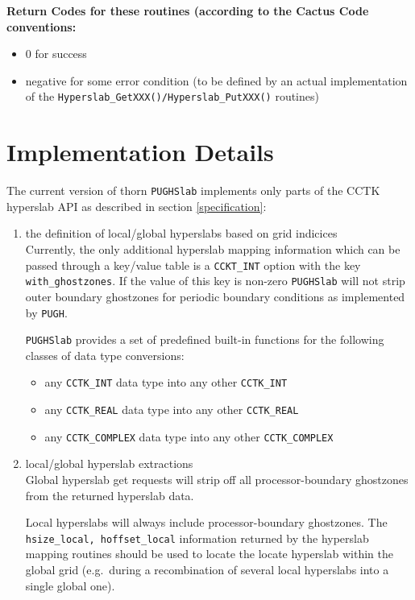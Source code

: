 \documentclass{article}
\begin{document}
{\bf Return Codes for these routines (according to the Cactus Code conventions:}
\begin{itemize}
  \item 0 for success
  \item negative for some error condition (to be defined by an actual
    implementation of the
    {\tt Hyperslab\_GetXXX()/Hyperslab\_PutXXX()} routines)
\end{itemize}

\section{Implementation Details}
\label{implementation}

The current version of thorn {\tt PUGHSlab} implements only parts of the
CCTK hyperslab API as described in section \ref{specification}:
\begin{enumerate}
  \item the definition of local/global hyperslabs based on grid indicices\\
    Currently, the only additional hyperslab mapping information which can be
    passed through a key/value table is a {\tt CCKT\_INT} option with the key
    {\tt with\_ghostzones}. If the value of this key is non-zero {\tt PUGHSlab}
    will not strip outer boundary ghostzones for periodic boundary conditions
    as implemented by {\tt PUGH}.

    {\tt PUGHSlab} provides a set of predefined built-in functions
    for the following classes of data type conversions:
    \begin{itemize}
      \item any {\tt CCTK\_INT} data type into any other {\tt CCTK\_INT}
      \item any {\tt CCTK\_REAL} data type into any other {\tt CCTK\_REAL}
      \item any {\tt CCTK\_COMPLEX} data type into any other {\tt CCTK\_COMPLEX}
    \end{itemize}

  \item local/global hyperslab extractions\\
    Global hyperslab get requests will strip off all processor-boundary
    ghostzones from the returned hyperslab data.

    Local hyperslabs will always include processor-boundary ghostzones.
    The {\tt hsize\_local, hoffset\_local} information returned by the
    hyperslab mapping routines should be used to locate the locate hyperslab
    within the global grid (e.g.\ during a recombination of several local
    hyperslabs into a single global one).
\end{enumerate}
\end{document}
